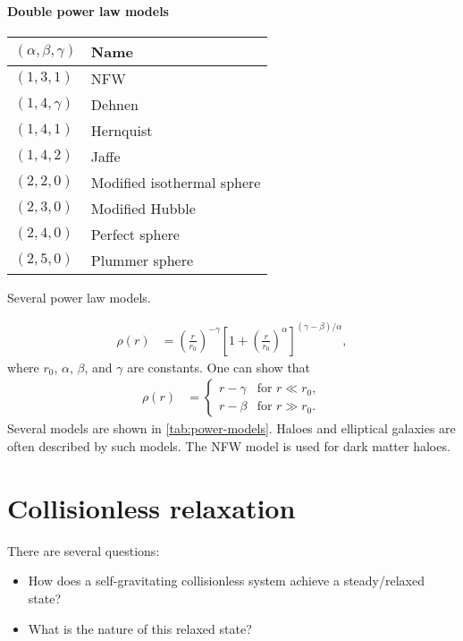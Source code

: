\paragraph*{Double power law models}
\begin{margintable}
	\footnotesize
	\begin{tabular}{ll}
		\toprule
		$(\alpha, \beta, \gamma)$ & Name\\
		\midrule
		$(1,3,1)$ & NFW\\
		$(1,4,\gamma)$ & Dehnen\\
		$(1,4,1)$ & Hernquist\\
		$(1,4,2)$ & Jaffe\\
		$(2,2,0)$ & Modified isothermal sphere\\
		$(2,3,0)$ & Modified Hubble\\
		$(2,4,0)$ & Perfect sphere\\
		$(2,5,0)$ & Plummer sphere\\
		\bottomrule
	\end{tabular}
	\caption{Several power law models.}
	\label{tab:power-models}
\end{margintable}
\begin{align*}
	\rho(r)
	&= \left( \frac{r}{r_0} \right)^{-\gamma}
	\left[ 1 + \left(\frac{r}{r_0}  \right)^\alpha \right]^{(\gamma-\beta)/\alpha},
\end{align*}
where $r_0$, $\alpha$, $\beta$, and $\gamma$ are constants.
One can show that
\begin{align*}
	\rho(r)
	&=
	\begin{cases}
		r - \gamma & \text{for } r \ll r_0,\\
		r - \beta & \text{for } r \gg r_0.
	\end{cases}
\end{align*}
Several models are shown in \cref{tab:power-models}.
Haloes and elliptical galaxies are often described by such models.
The NFW model is used for dark matter haloes.














\section{Collisionless relaxation}
There are several questions:
\begin{itemize}
	\item How does a self-gravitating collisionless system achieve a steady/relaxed state?
	\item What is the nature of this relaxed state?
\end{itemize}


